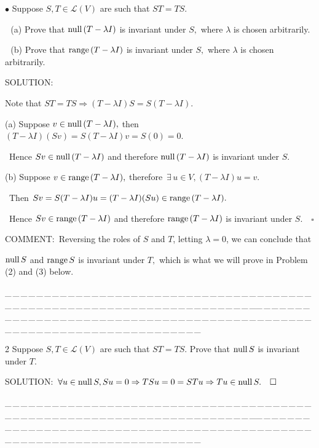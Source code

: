 \documentclass[a4paper, 11pt, UTF8]{article}
\def\range{\textup{range}\,}
\def\null{\textup{null\,}}
\def\Lm{\mathcal{L}}
\begin{document}
\begin{large}
{\small $\bullet$} {\timessl\Large
Suppose $S,T\in\Lm(V)$ are such that $ST=TS.$ 
}\par\,\,
(a) {\timessl\Large Prove that $\null(T-\lambda I)$ is invariant under $S,$ where $\lambda$ is chosen arbitrarily.
}\par\,\,
(b) {\timessl\Large Prove that $\range(T-\lambda I)$ is invariant under $S,$ where $\lambda$ is chosen arbitrarily.}\par
{\timesbf S\footnotesize{OLUTION:}}\par\quad
Note that $ST=TS\Rightarrow (T-\lambda I)S=S(T-\lambda I).$\par\quad
(a) Suppose $v\in\null(T-\lambda I),$ then $(T-\lambda I)(Sv)=S(T-\lambda I)v=S(0)=0.$\par\qquad\,
Hence $Sv\in\null(T-\lambda I)$ and therefore $\null(T-\lambda I)$ is invariant under $S.$\par\quad
(b) Suppose $v\in\range(T-\lambda I),$ therefore $\,\exists\,u\in V,(T-\lambda I)u=v.$\par\qquad\,
Then $ Sv=S(T-\lambda I)u=(T-\lambda I)(Su)\in\range(T-\lambda I).$\par\qquad\,
Hence $Sv\in\range(T-\lambda I)$ and therefore $\range(T-\lambda I)$ is invariant under $S.\quad\square$\par\quad
C{\small OMMENT:}\, Reversing the roles of $S$ and $T$, letting $\lambda=0$, we can conclude that\par\qquad\qquad\qquad
$\null S$ and $\range S$ is invariant under $T,$ which is what we will prove in Problem (2) and (3) below.\par
{\tiny \_\,\_\,\_\,\_\,\_\,\_\,\_\,\_\,\_\,\_\,\_\,\_\,\_\,\_\,\_\,\_\,\_\,\_\,\_\,\_\,\_\,\_\,\_\,\_\,\_\,\_\,\_\,\_\,\_\,\_\,\_\,\_\,\_\,\_\,\_\,\_\,\_\,\_\,\_\,\_\,\_\,\_\,\_\,\_\,\_\,\_\,\_\,\_\,\_\,\_\,\_\,\_\,\_\,\_\,\_\,\_\,\_\,\_\,\_\,\_\,\_\,\_\,\_\,\_\,\_\,\_\,\_\,\_\,\_\,\_\,\_\_\,\_\,\_\,\_\,\_\,\_\,\_\,\_\,\_\,\_\,\_\,\_\,\_\,\_\,\_\,\_\,\_\,\_\,\_\,\_\,\_\,\_\,\_\,\_\,\_\,\_\,\_\,\_\,\_\,\_\,\_\,\_\,\_\,\_\,\_\,\_\,\_\,\_\,\_\,\_\,\_\,\_\,\_\,\_\,\_\,\_\,\_\,\_\,\_\,\_\,\_\,\_\,\_\,\_\,\_\,\_\,\_\,\_\,\_\,\_\,\_\,\_\,\_\,\_\,\_\,\_\,\_\,\_\,\_\,\_\,\_}\par

{\timesbf\Large 2} {\timessl\Large 
Suppose $S,T\in\Lm(V)$ are such that $ST=TS.$ Prove that $\null S$ is invariant under $T.$}\par
{\timesbf S\footnotesize{OLUTION:}}\,\,\,$\forall u\in\null S,Su=0\Rightarrow TSu=0=STu\Rightarrow Tu\in\null S.\quad\square$\par
{\tiny \_\,\_\,\_\,\_\,\_\,\_\,\_\,\_\,\_\,\_\,\_\,\_\,\_\,\_\,\_\,\_\,\_\,\_\,\_\,\_\,\_\,\_\,\_\,\_\,\_\,\_\,\_\,\_\,\_\,\_\,\_\,\_\,\_\,\_\,\_\,\_\,\_\,\_\,\_\,\_\,\_\,\_\,\_\,\_\,\_\,\_\,\_\,\_\,\_\,\_\,\_\,\_\,\_\,\_\,\_\,\_\,\_\,\_\,\_\,\_\,\_\,\_\,\_\,\_\,\_\,\_\,\_\,\_\,\_\,\_\,\_\_\,\_\,\_\,\_\,\_\,\_\,\_\,\_\,\_\,\_\,\_\,\_\,\_\,\_\,\_\,\_\,\_\,\_\,\_\,\_\,\_\,\_\,\_\,\_\,\_\,\_\,\_\,\_\,\_\,\_\,\_\,\_\,\_\,\_\,\_\,\_\,\_\,\_\,\_\,\_\,\_\,\_\,\_\,\_\,\_\,\_\,\_\,\_\,\_\,\_\,\_\,\_\,\_\,\_\,\_\,\_\,\_\,\_\,\_\,\_\,\_\,\_\,\_\,\_\,\_\,\_\,\_\,\_\,\_\,\_\,\_}\par


\end{large}
\end{document}
